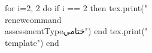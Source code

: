 \documentclass[twoside, 12pt]{article}
\title{}
\date{}
\newcommand{\assessmentType}{تكويني}
\newcommand{\template}{
\noindent
{\large
الاسم الأول \rule{6em}{.4pt}
\hspace{\stretch{1}}
اسم العائلة \rule{6em}{.4pt}
\hspace{\stretch{1}}
التاريخ
\raisebox{0.3em}{\underline{\quad\color{white}\today\quad}}
\hspace{\stretch{1}}
الحصة \rule{2em}{.4pt}
\hspace{\stretch{1}}
}

\vspace{1em}

\noindent
\renewcommand{\arraystretch}{2}
\begin{tabular}{|l|l|l|}
\hline
\textbf{الاستدلال} &
\textbf{النمذجة} &
\textbf{الدقة} \\
\hline
&&\\
\hline
\end{tabular}

\vspace{1em}

\noindent
\textbf{الأدوات:} آلة حاسبة علمية

\vspace{1em}

\begin{enumerate}[leftmargin=*, itemsep=1.2em]

\item

\begin{center}
\begin{tikzpicture}
\begin{axis}[
    width=8cm,
    height=8cm,
    axis lines=middle,
    xmin=-5, xmax=5,
    ymin=-8, ymax=8,
    grid=both,
    minor tick num=1,
    xlabel={$x$},
    ylabel={$y$},
    samples=200,
    clip=true
]
\addplot[domain=-5:5] {(x+1)*(x-4)};
\end{axis}
\end{tikzpicture}
\end{center}

\begin{enumerate}

\item (\textbf{الدقة})

حدّد جميع نقاط تقاطع المنحنى أعلاه مع المحورين الأفقي والرأسي.

\vspace{\stretch{1}}

\item (\textbf{الاستدلال})

اشرح لماذا لا يمثّل الرسم البياني الدالة التربيعية
\[
y=(x-1)(x+4)
\]
وذلك بمقارنة نقاط التقاطع مع محور \(x\).
وعلى وجه الخصوص، اشرح كيف تحدّد نقاط التقاطع مع محور \(x\) للدالة المعطاة.

\vspace{\stretch{1}}

\end{enumerate}

\clearpage

\item

\begin{center}
\begin{tikzpicture}
\begin{axis}[
    width=8cm,
    height=8cm,
    axis lines=middle,
    xmin=-5, xmax=5,
    ymin=-8, ymax=8,
    grid=both,
    minor tick num=1,
    xlabel={$x$},
    ylabel={$y$},
    samples=200,
    clip=true
]
\addplot[domain=-5:5] {1/2*(x+3)*(x-4)};
\end{axis}
\end{tikzpicture}
\end{center}

\begin{enumerate}

\item (\textbf{الدقة})

حدّد جميع نقاط تقاطع المنحنى أعلاه مع المحورين الأفقي والرأسي.

\vspace{\stretch{1}}

\item (\textbf{الدقة})

حدّد جميع نقاط تقاطع الدالة التربيعية
\[
y=(x+3)(x-4)
\]
مع المحورين الأفقي والرأسي.

\vspace{\stretch{1}}

\item (\textbf{الاستدلال})

اشرح لماذا لا يمثّل الرسم البياني الدالة التربيعية المعطاة أعلاه.

\vspace{\stretch{1}}

\item (\textbf{النمذجة})

أنشئ معادلة الدالة التي يمثّلها الرسم البياني.

\vspace{\stretch{1}}

\end{enumerate}

\end{enumerate}
}
\begin{document}
\begin{Arabic}

\begin{luacode*}
for i=2, 2 do
    if i == 2 then
        tex.print("\\renewcommand{\\assessmentType}{ختامي}")
    end
    tex.print("\\template")
end
\end{luacode*}

\end{Arabic}
\end{document}
